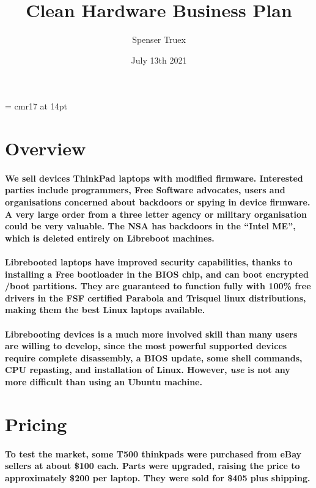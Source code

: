 \documentclass{article}
\begin{document}
\title{Clean Hardware Business Plan}
\author{Spenser Truex}
\date{July 13th 2021}

\maketitle

\font\tenrm = cmr17 at 14pt
\tenrm

\section{Overview}

\paragraph{We sell devices ThinkPad laptops with modified
firmware. Interested parties include programmers, Free Software advocates,
users and organisations concerned about backdoors or spying in device
firmware. A very large order from a three letter agency or military
organisation could be very valuable. The NSA has backdoors in the ``Intel
ME'', which is deleted entirely on Libreboot machines.}

\paragraph{Librebooted laptops have improved security capabilities, thanks to
installing a Free bootloader in the BIOS chip, and can boot encrypted
/boot partitions. They are guaranteed to function fully with 100\%
free drivers in the \textbf{FSF certified Parabola and Trisquel linux
distributions}, making them the best Linux laptops available.}

\paragraph{Librebooting devices is a much more involved skill than many users are
willing to develop, since the most powerful supported devices require
complete disassembly, a BIOS update, some shell commands, CPU
repasting, and installation of Linux. However, \textit{use} is not any
more difficult than using an Ubuntu machine.}

\section{Pricing}
\paragraph{To test the market, some T500 thinkpads were purchased from eBay sellers
at about \$100 each. Parts were upgraded, raising the price to
approximately \$200 per laptop. They were sold for \$405 plus shipping.}
\end{document}
